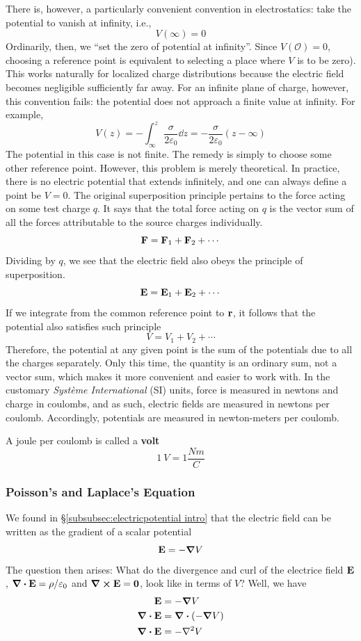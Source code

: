 			There is, however, a particularly convenient convention in electrostatics: take the potential
			to vanish at infinity, i.e.,
			\[
				V(\infty)= 0
			\]
			Ordinarily, then, we ``set the zero of potential at infinity''. Since $V(\mathcal{O})=0$, choosing a reference
			point is equivalent to selecting a place where $V$ is to be zero). This works naturally for 
			localized charge distributions because the electric field becomes 
			negligible sufficiently far away. For an infinite plane of charge, however, this convention 
			fails: the potential does not approach a finite value at infinity. For example,	
			\[
				V(z) = -\int_\infty^z \frac{\sigma}{2\varepsilon_0}\dd{z} = -\frac{\sigma}{2\varepsilon_0}(z-\infty)
			\]
			The potential in this case is not finite. 
			The remedy is simply to choose some other reference point. However, this problem is merely theoretical. 
			In practice, there is no electric potential that extends infinitely, and one can always define a point
			be $V=0$. 
			The original superposition principle pertains to the force acting on some test 
			charge $q$. It says that the total force acting on $q$ is the vector sum of all
			the forces attributable to the source charges individually.
			\[
				\vb{F} = \vb{F}_1 + \vb{F}_2 + \cdots
			\]
			Dividing by $q$, we see that the electric field also obeys the principle of superposition.
			\[
				\vb{E} = \vb{E}_1 + \vb{E}_2 + \cdots
			\]
			If we integrate from the common reference point to $\vb r$, it follows that the 
			potential also satisfies such principle
			\[
				V = V_1 + V_2 + \cdots
			\]
			Therefore, the potential at any given point is the sum of the potentials due to
			all the charges separately. Only this time, the quantity is an ordinary sum, not 
			a vector sum, which makes it more convenient and easier to work with.
			In the customary \textit{Syst\`eme International} (SI) units, force is measured in
			newtons and charge in coulombs, and as such, electric fields are measured in newtons per 
			coulomb. Accordingly, potentials are measured in newton-meters per coulomb.

			A joule per coulomb is called a \textbf{volt}
			\[
				\SI{1}{V} = 1 \frac{\unit{Nm}}{\unit{C}} 
			\]
	\subsubsection{Poisson's and Laplace's Equation}
		We found in \S \ref{subsubsec:electricpotential intro} that the electric field 
		can be written as the gradient of a scalar potential
		\[
			\vb{E} = -\grad V
		\]
		The question then arises: What do the divergence and curl of  the electrice field $\vb E$,
		$\div\vb E = \rho/\varepsilon_0$ and $\curl\vb E = \vb{0}$, look like in terms
		of $V$? Well, we have
		\begin{align*}
			\vb{E} &= -\grad V\\
			\div\vb{E} &= \div(-\grad V)\\
			\div\vb{E} &= -\lpc V
		\end{align*}

